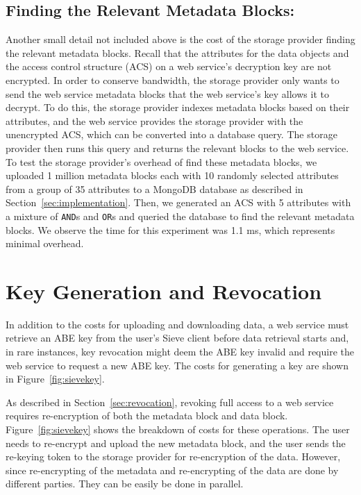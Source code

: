 \subsection{Finding the Relevant Metadata Blocks:} Another small detail not included above
is the cost of the storage provider finding the relevant metadata blocks. 
Recall that the attributes for the data objects
and the access control structure (ACS) on a web service's decryption key
are not encrypted. In order to conserve bandwidth, the storage provider
only wants to send the web service metadata blocks that the web service's
key allows it to decrypt. To do this, the storage provider indexes metadata blocks
based on their attributes, and the web service provides the storage provider
with the unencrypted ACS, which can be converted into a database query. 
The storage provider then runs this query and returns
the relevant blocks to the web service.
To test the storage provider's overhead of find these metadata blocks, we uploaded
1 million metadata blocks each with 10 randomly selected attributes from a group 
of 35 attributes to a MongoDB database as described in Section~\ref{sec:implementation}.
Then, we generated an ACS with 5 attributes with a mixture of \texttt{AND}s and 
\texttt{OR}s and queried the database to find the relevant metadata
blocks. We observe the time for this experiment was 1.1 ms, which represents
minimal overhead.

\section{Key Generation and Revocation}

In addition to the costs for uploading and downloading data,
a web service must retrieve an ABE key from the user's Sieve client before
data retrieval starts and, in rare instances,
key revocation might deem the ABE key invalid and require
the web service to request a new ABE key. 
The costs for generating a key are shown in Figure~\ref{fig:sievekey}.

As described in Section~\ref{sec:revocation}, revoking full access
to a web service requires re-encryption of both the metadata block
and data block. Figure~\ref{fig:sievekey} shows the breakdown of 
costs for these operations.
The user needs to re-encrypt and upload the new metadata block, and
the user sends the re-keying token to the storage provider for re-encryption
of the data. However, since re-encrypting of the metadata and re-encrypting
of the data are done by different parties. They can be easily be done in 
parallel. 


